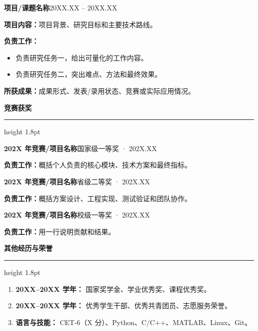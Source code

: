 \documentclass[10.5pt,a4paper]{ctexart}
\newcommand{\profilesection}[1]{%
  \vspace{0.52em}%
  {\large\bfseries\color{HNURed}#1}\par\vspace{0.12em}%
  {\color{HNURed}\hrule height 1.8pt}%
  \vspace{0.28em}%
}
\newcommand{\rightmeta}[1]{\hfill{\color{Muted}\small #1}}
\newcommand{\entrytitle}[2]{\textbf{#1}\rightmeta{#2}\par}
\newcommand{\labelitem}[1]{\textbf{\color{HNUBlack}#1}}
\begin{document}
\vspace{0.25em}
\entrytitle{项目/课题名称}{20XX.XX -- 20XX.XX}
\labelitem{项目内容：}项目背景、研究目标和主要技术路线。\par
\labelitem{负责工作：}
\begin{itemize}
  \item 负责研究任务一，给出可量化的工作内容。
  \item 负责研究任务二，突出难点、方法和最终效果。
\end{itemize}
\labelitem{所获成果：}成果形式、发表/录用状态、竞赛或实际应用情况。

\profilesection{竞赛获奖}
\entrytitle{202X 年竞赛/项目名称}{国家级一等奖 · 202X.XX}
\labelitem{负责工作：}概括个人负责的核心模块、技术方案和最终指标。\par

\vspace{0.18em}
\entrytitle{202X 年竞赛/项目名称}{省级二等奖 · 202X.XX}
\labelitem{负责工作：}概括方案设计、工程实现、测试验证和团队协作。\par

\vspace{0.18em}
\entrytitle{202X 年竞赛/项目名称}{校级一等奖 · 202X.XX}
\labelitem{负责工作：}用一行说明贡献和结果。

\profilesection{其他经历与荣誉}
\begin{enumerate}
  \item \textbf{20XX--20XX 学年：} 国家奖学金、学业优秀奖、课程优秀奖。
  \item \textbf{20XX--20XX 学年：} 优秀学生干部、优秀共青团员、志愿服务荣誉。
  \item \textbf{语言与技能：} CET-6（X 分）、Python、C/C++、MATLAB、Linux、Git。
\end{enumerate}
\end{document}
